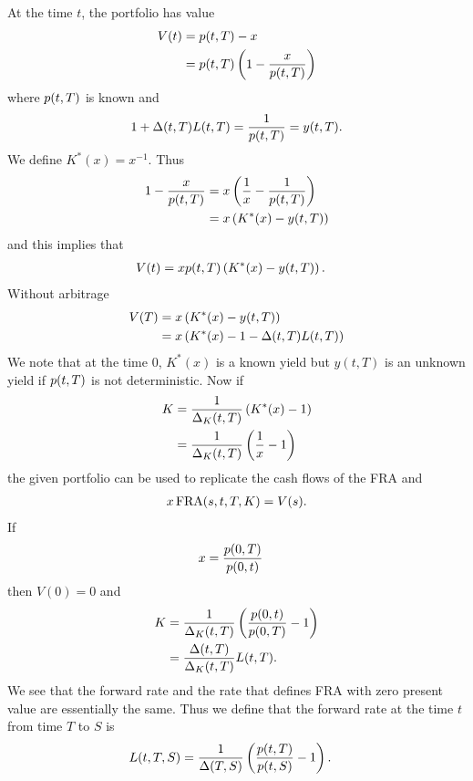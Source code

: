 At the time $t$, the portfolio has value
\begin{align}
V(t) &= p(t,T) - x \\
&= p(t,T) \left( 1 - \frac{x}{p(t,T)} \right)
\end{align}
where $p(t,T)$ is known and
\begin{align}
1 + \Delta(t,T) L(t,T) = \frac{1}{p(t,T)} = y(t,T).
\end{align}	
We define $K^*(x) = x^{-1}$. Thus
\begin{align}
1 - \frac{x}{p(t,T)} &= x \left( \frac{1}{x} - \frac{1}{p(t,T)} \right) \\
&= x \left( K^*(x) -  y(t,T)  \right) 
\end{align}
and this implies that
\begin{align}
\label{forwardpricelemmaquation}
V(t) &= x p(t,T) \left( K^*(x) - y(t,T) \right) .
\end{align}
Without arbitrage
\begin{align}
\label{forwardpricelemmaquation1}
V(T) &= x \left( K^*(x) - y(t,T) \right) \\
&= x \left( K^*(x) - 1 - \Delta(t,T) L(t,T) \right)
\end{align}
We note that at the time $0$, $K^*(x)$ is a known yield but $y(t,T)$ is an unknown yield if $p(t,T)$ is not deterministic. Now if
\begin{align}
K &= \frac{1}{\Delta_K(t,T)} \left( K^*(x) - 1 \right) \\
&= \frac{1}{\Delta_K(t,T)} \left( \frac{1}{x} - 1 \right)
\end{align}
the given portfolio can be used to replicate the cash flows of the FRA and
\begin{align}
x \operatorname{\mathrm{FRA}}(s,t,T,K) = V(s) .
\end{align}
If
\begin{align}
x &= \frac{p(0,T)}{p(0,t)}
\end{align}
then $V(0) = 0$ and
\begin{align}
K &= \frac{1}{\Delta_K(t,T)} \left( \frac{p(0,t)}{p(0,T)} - 1 \right) \\
&= \frac{\Delta(t,T)}{\Delta_K(t,T)}  L(t,T) .
\end{align}
We see that the forward rate and the rate that defines FRA with zero present value are essentially the same. Thus we define that the forward rate at the time $t$ from time $T$ to $S$ is
\begin{align}
	L(t,T,S) &= \frac{1}{\Delta(T,S)} \left( \frac{p(t,T)}{p(t,S)} - 1 \right) .
\end{align}
